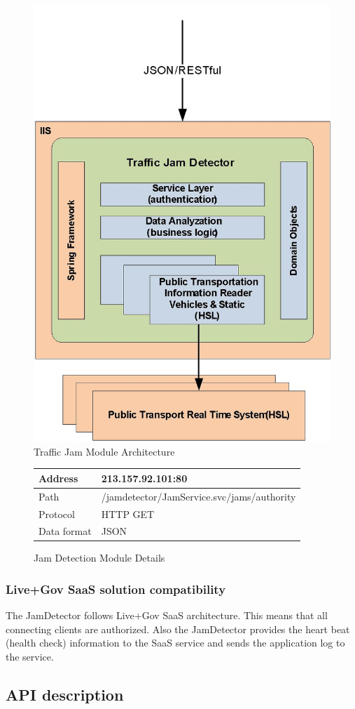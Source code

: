 \begin{figure}
\centering
\includegraphics[width=0.5 \textwidth]{img/tjd/architecture.jpg}
\caption{Traffic Jam Module Architecture}\label{fig:tjd_architecture}
\end{figure}

\begin{figure}
\centering
\begin{tabular}{|l|l|}
\hline
Address     & 213.157.92.101:80 \\ \hline
Path        & /jamdetector/JamService.svc/jams/{authority} \\ \hline
Protocol    & HTTP GET \\ \hline
Data format & JSON \\ \hline
\end{tabular}
\caption{Jam Detection Module Details}
\end{figure}

\subsubsection*{Live+Gov SaaS solution compatibility}

The JamDetector follows Live+Gov SaaS architecture. This means that
all connecting clients are authorized. Also the JamDetector provides
the heart beat (health check) information to the SaaS service and
sends the application log to the service.  

\subsection*{API description}

